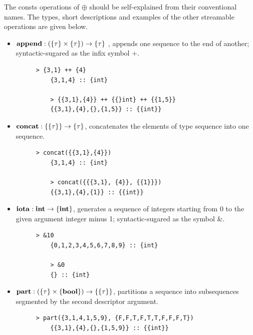 The consts operations of $\oplus$ should be self-explained from their conventional names. 
The types, short descriptions and examples of the other streamable operations are given below.

\begin{itemize}

	\item $\mathbf{append : (\{\tau\} \times \{\tau\}) \rightarrow \{\tau\}}$ , 
	appends one sequence to the end of another; syntactic-sugared as the infix symbol {\++}.

	\begin{figure}[H]
	\begin{example}
	\end{example}
	\begin{lstlisting}[style = snesl-style]
	> {3,1} ++ {4}
	{3,1,4} :: {int}
	
	> {{3,1},{4}} ++ {{}int} ++ {{1,5}}
	{{3,1},{4},{},{1,5}} :: {{int}}
	\end{lstlisting}
	\end{figure}


	\item $\mathbf{concat: \{\{\tau\}\} \rightarrow \{\tau\} }$, concatenates the elements of type sequence into one sequence. 
	\begin{figure}[H]
	\begin{example}
	\end{example}
	\begin{lstlisting}[style = snesl-style]
	> concat({{3,1},{4}})
	{3,1,4} :: {int}
	
	> concat({{{3,1}, {4}}, {{1}}})
	{{3,1},{4},{1}} :: {{int}}
	\end{lstlisting}
	\end{figure}

	\item $\mathbf{iota: \mathbf{int} \rightarrow \{\mathbf{int}\}}$, generates a sequence of integers starting from 0 to the given argument integer minus 1; syntactic-sugared as the symbol \&. 
	\begin{figure}[H]
	\begin{example}
	\end{example}
	\begin{lstlisting}[style = snesl-style]
	> &10
	{0,1,2,3,4,5,6,7,8,9} :: {int}
	
	> &0
	{} :: {int}
	\end{lstlisting}
	\end{figure}
	
	\item $\mathbf{part: (\{\tau\} \times \{\mathbf{bool}\}) \rightarrow  \{\{\tau\}\}}$,  partitions a sequence into subsequences segmented by the second descriptor argument. 
	\begin{figure}[H]
	\begin{example}
	\end{example}
	\begin{lstlisting}[style = snesl-style]
	> part({3,1,4,1,5,9}, {F,F,T,F,T,T,F,F,F,T})
	{{3,1},{4},{},{1,5,9}} :: {{int}}
	

\end{lstlisting}
\end{figure}
\end{itemize}
